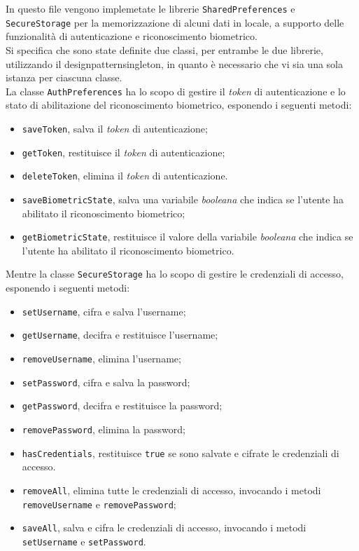 In questo file vengono implemetate le librerie \lstinline{SharedPreferences}\cite{site:shared-preferences} e \lstinline{SecureStorage}\cite{site:flutter-secure-storage} per la memorizzazione di alcuni dati in locale, a supporto delle funzionalità di autenticazione e riconoscimento biometrico. \\
Si specifica che sono state definite due classi, per entrambe le due librerie, utilizzando il \gls{designpattern}\glsoccur \gls{singleton}\glsoccur, in quanto è necessario che vi sia una sola istanza per ciascuna classe. \\
La classe \lstinline{AuthPreferences} ha lo scopo di gestire il \emph{token} di autenticazione e lo stato di abilitazione del riconoscimento biometrico, esponendo i seguenti metodi:
\begin{itemize}
    \item \lstinline{saveToken}, salva il \emph{token} di autenticazione;
    \item \lstinline{getToken}, restituisce il \emph{token} di autenticazione;
    \item \lstinline{deleteToken}, elimina il \emph{token} di autenticazione.
    \item \lstinline{saveBiometricState}, salva una variabile \emph{booleana} che indica se l'utente ha abilitato il riconoscimento biometrico;
    \item \lstinline{getBiometricState}, restituisce il valore della variabile \emph{booleana} che indica se l'utente ha abilitato il riconoscimento biometrico.
\end{itemize}
Mentre la classe \lstinline{SecureStorage} ha lo scopo di gestire le credenziali di accesso, esponendo i seguenti metodi:
\begin{itemize}
    \item \lstinline{setUsername}, cifra e salva l'username;
    \item \lstinline{getUsername}, decifra e restituisce l'username;
    \item \lstinline{removeUsername}, elimina l'username;
    \item \lstinline{setPassword}, cifra e salva la password;
    \item \lstinline{getPassword}, decifra e restituisce la password;
    \item \lstinline{removePassword}, elimina la password;
    \item \lstinline{hasCredentials}, restituisce \lstinline{true} se sono salvate e cifrate le credenziali di accesso.
    \item \lstinline{removeAll}, elimina tutte le credenziali di accesso, invocando i metodi \lstinline{removeUsername} e \lstinline{removePassword};
    \item \lstinline{saveAll}, salva e cifra le credenziali di accesso, invocando i metodi \lstinline{setUsername} e \lstinline{setPassword}.
\end{itemize}

